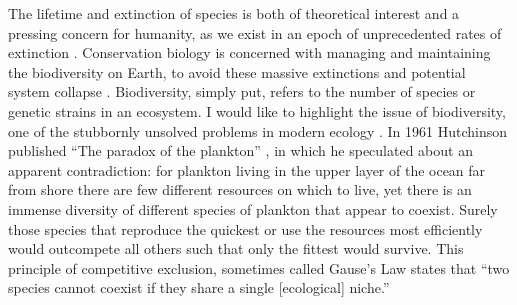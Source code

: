 The lifetime and extinction of species is both of theoretical interest and a pressing concern for humanity, as we exist in an epoch of unprecedented rates of extinction \cite{Saavedra2013}. 
Conservation biology is concerned with managing and maintaining the biodiversity on Earth, to avoid these massive extinctions and potential system collapse \cite{Shaffer1981,Pimm1988,Peterson1997,McKane2000,Saavedra2013,Kalyuzhny2014}. 
Biodiversity, simply put, refers to the number of species or genetic strains in an ecosystem. 
%
I would like to highlight the issue of biodiversity, one of the stubbornly unsolved problems in modern ecology \cite{May1999,Chesson2000,Pennisi2005,Kelly2008}. %
In 1961 Hutchinson published ``The paradox of the plankton'' \cite{Hutchinson1961}, in which he speculated about an apparent contradiction: for plankton living in the upper layer of the ocean far from shore there are few different resources on which to live, yet there is an immense diversity of different species of plankton that appear to coexist. %
Surely those species that reproduce the quickest or use the resources most efficiently would outcompete all others such that only the fittest would survive. 
This principle of competitive exclusion, sometimes called Gause's Law \cite{Gause1934} states that ``two species cannot coexist if they share a single [ecological] niche.''
